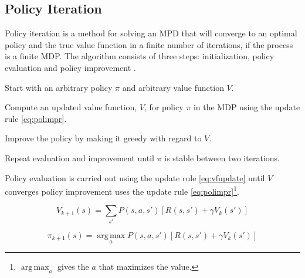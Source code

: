\subsection{Policy Iteration }
\label{sec:pol_itr}

Policy iteration is a method for solving an MPD that will converge to an optimal policy and the true value function in a finite number of iterations, if the process is a finite MDP. The algorithm consists of three steps: initialization, policy evaluation and policy improvement \parencite{barto1998reinforcement}.

\begin{description}
\item[Initialization]
    Start with an arbitrary policy $\pi$ and arbitrary value function $V$.
\item[Policy evaluation]
    Compute an updated value function, $V$, for policy $\pi$ in the MDP using the update rule \eqref{eq:polimpr}.
\item[Policy improvement]
    Improve the policy by making it greedy with regard to $V$.
\item Repeat evaluation and improvement until $\pi$ is stable between two iterations.
\end{description}

Policy evaluation is carried out using the update rule \eqref{eq:vfupdate} until $V$ converges
policy improvement uses the update rule \eqref{eq:polimpr}\footnote{$\operatorname*{arg\,max} _a$ gives the $a$ that maximizes the value.}.


\begin{equation} \label{eq:vfupdate}
V_{k+1} (s) = \sum_{s'} P(s, a, s') \left[ R(s, s') + \gamma V_k(s')  \right]
\end{equation}

\begin{equation} \label{eq:polimpr}
\pi_{k+1} (s) = \operatorname*{arg\,max}_a P(s, a, s') \left[ R(s, s') + \gamma V_k(s') \right]
\end{equation}